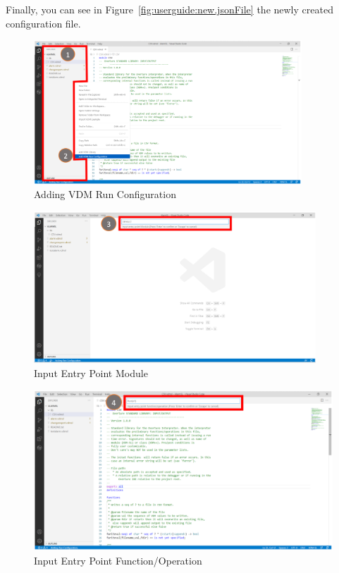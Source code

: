 \documentclass{overturerepchap}
\begin{document}
Finally, you can see in Figure~\ref{fig:userguide:new.jsonFile} the newly created configuration file.


\begin{figure}[htp]
\begin{center}
  \includegraphics[width=380px]{snapshots/Add VDM Run Configuration.PNG}
  \caption{Adding VDM Run Configuration}
  \label{fig:userguide:launchconfig}
\end{center}
\end{figure}

\begin{figure}[htp]
\begin{center}
  \includegraphics[width=400px]{snapshots/Input entry point module.PNG}
  \caption{Input Entry Point Module}
  \label{fig:userguide:launchconfigRToptions}
\end{center}
\end{figure}


\begin{figure}[htp]
\begin{center}
  \includegraphics[width=460px]{snapshots/Input entry point function.PNG}
  \caption{Input Entry Point Function/Operation}
  \label{fig:userguide:launchconfigSpecialoptions}
\end{center}
\end{figure}
\end{document}
